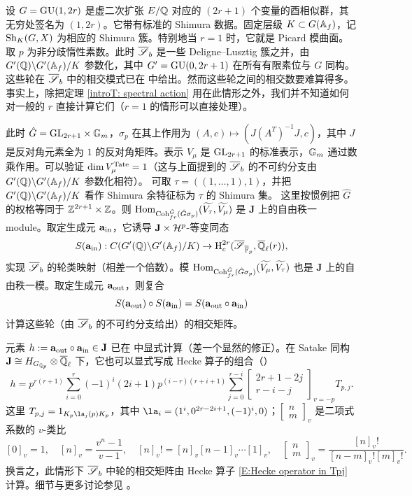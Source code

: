 \begin{ex}
设 $G=\operatorname{GU}(1,2r)$ 是虚二次扩张 $E/{\mathbb Q}$ 对应的 $(2r+1)$ 个变量的酉相似群，其无穷处签名为 $(1,2r)$。它带有标准的 Shimura 数据。固定层级 $K\subset G({\mathbb A}_f)$，记 $\operatorname{Sh}_K(G,X)$ 为相应的 Shimura 簇。特别地当 $r=1$ 时，它就是 Picard 模曲面。取 $p$ 为非分歧惰性素数。此时 $\overline{\mathscr{S}}_b$ 是一些 Deligne–Lusztig 簇之并，由 $G'({\mathbb Q})\backslash G'({\mathbb A}_f)/K$ 参数化，其中 $G'=\operatorname{GU}(0,2r+1)$ 在所有有限素位与 $G$ 同构。这些轮在 $\overline{\mathscr{S}}_b$ 中的相交模式已在 \cite{VW} 中给出。然而这些轮之间的相交数要难算得多。事实上，除把定理 \ref{introT: spectral action} 用在此情形之外，我们并不知道如何对一般的 $r$ 直接计算它们（$r=1$ 的情形可以直接处理）。

此时 $\hat G={\operatorname{GL}}_{2r+1}\times {\mathbb G}_m$，$\sigma_p$ 在其上作用为 $(A,c)\mapsto (J(A^T)^{-1}J,c)$，其中 $J$ 是反对角元素全为 $1$ 的反对角矩阵。表示 $V_\mu$ 是 ${\operatorname{GL}}_{2r+1}$ 的标准表示，${\mathbb G}_m$ 通过数乘作用。可以验证 $\dim V_\mu^{\mathrm{Tate}}=1$（这与上面提到的 $\overline{\mathscr{S}}_b$ 的不可约分支由 $G'({\mathbb Q})\backslash G'({\mathbb A}_f)/K$ 参数化相符）。
可取 $\tau=((1,\ldots,1),1)$，并把 $G'({\mathbb Q})\backslash G'({\mathbb A}_f)/K$ 看作 Shimura 余特征标为 $\tau$ 的 Shimura 集。
这里按惯例把 $\hat G$ 的权格等同于 ${\mathbb Z}^{2r+1}\times{\mathbb Z}$。则 ${\operatorname{Hom}}_{{\operatorname{Coh}}^{\hat G}_{fr}(\hat G\sigma_p)}(\widetilde{V_{\tau}},\widetilde{V_{\mu}})$ 是 $\mathbf J$ 上的自由秩一 module。取定生成元 $\mathbf a_{\operatorname{in}}$，它诱导 $\mathbf J\times{\mathcal H}^p$-等变同态
$$S(\mathbf a_{\operatorname{in}}): C(G'({\mathbb Q})\backslash G'({\mathbb A}_f)/K)\to \operatorname{H}_c^{2r}(\overline{\mathscr{S}}_{\overline{{\mathbb F}}_p},{\overline{{\mathbb Q}}_\ell}(r)),$$
实现 $\overline{\mathscr{S}}_b$ 的轮类映射（相差一个倍数）。模 ${\operatorname{Hom}}_{{\operatorname{Coh}}^{\hat G}_{fr}(\hat G\sigma_p)}(\widetilde{V_{\mu}},\widetilde{V_{\tau}})$ 也是 $\mathbf J$ 上的自由秩一模。取定生成元 $\mathbf a_{\mathrm{out}}$，则复合
\[S(\mathbf{a}_{\mathrm{out}})\circ S(\mathbf{a}_{\operatorname{in}})=S(\mathbf{a}_{\mathrm{out}}\circ\mathbf{a}_{\operatorname{in}})\]
计算这些轮（由 $\overline{\mathscr{S}}_b$ 的不可约分支给出）的相交矩阵。

元素 $h:=\mathbf{a}_{\mathrm{out}}\circ\mathbf{a}_{\operatorname{in}} \in \mathbf J$ 已在 \cite[例 6.4.2]{XZ2} 中显式计算（差一个显然的修正）。在 Satake 同构 $\mathbf J\cong H_{G_{{\mathbb Q}_p}}\otimes {\overline{{\mathbb Q}}_\ell}$ 下，它也可以显式写成 Hecke 算子的组合（\cite{XZ3}）
\begin{equation}
\label{E:Hecke operator in Tpj}
h=p^{r(r+1)}\sum_{i=0}^{r} (-1)^i(2i+1)p^{(i-r)(r+i+1)}\sum_{j=0}^{r-i} \begin{bmatrix} 2r+1-2j \\ r-i- j\end{bmatrix}_{v=-p}T_{p,j}.
\end{equation}
这里 $T_{p,j}=1_{K_p\la_j(p)K_p}$，其中 $\la_i=(1^i,0^{2r-2i+1},(-1)^i,0)$；$\begin{bmatrix} n \\ m\end{bmatrix}_v$ 是二项式系数的 $v$-类比
\[
[0]_v=1,\quad [n]_v=\frac{v^n-1}{v-1},\quad [n]_v!=[n]_v[n-1]_v\cdots[1]_v,\quad \begin{bmatrix} n \\ m\end{bmatrix}_v=\frac{[n]_v!}{[n-m]_v![m]_v!}.
\]
换言之，此情形下 $\overline{\mathscr{S}}_b$ 中轮的相交矩阵由 Hecke 算子 \eqref{E:Hecke operator in Tpj} 计算。细节与更多讨论参见 \cite{XZ3}。
\end{ex}
